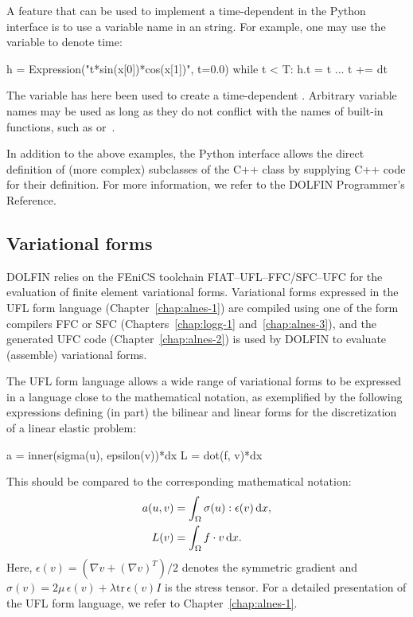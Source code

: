 \enlargethispage{12pt}

A feature that can be used to implement a time-dependent 
in the Python interface is to use a variable name in an 
string.  For example, one may use the variable  to denote time:
\begin{python}
h = Expression("t*sin(x[0])*cos(x[1])", t=0.0)
while t < T:
    h.t = t
    ...
    t += dt
\end{python}
The  variable has here been used to create a time-dependent
. Arbitrary variable names may be used as long as they
do not conflict with the names of built-in functions, such as 
or~.

In addition to the above examples, the Python interface allows
the direct definition of (more complex) subclasses of the C++
 class by supplying C++ code for their definition. For
more information, we refer to the DOLFIN Programmer's Reference.

\subsection{Variational forms}

DOLFIN relies on the FEniCS toolchain FIAT--UFL--FFC/SFC--UFC for the
evaluation of finite element variational forms. Variational forms
expressed in the UFL form language (Chapter~\ref{chap:alnes-1})
are compiled using one of the form compilers FFC or SFC
(Chapters~\ref{chap:logg-1} and~\ref{chap:alnes-3}), and the generated
UFC code (Chapter~\ref{chap:alnes-2}) is used by DOLFIN to
evaluate (assemble) variational forms.

The UFL form language allows a wide range of variational forms to be
expressed in a language close to the mathematical notation, as exemplified
by the following expressions defining (in part) the bilinear and linear
forms for the discretization of a linear elastic problem:
\begin{uflcode}
a = inner(sigma(u), epsilon(v))*dx
L = dot(f, v)*dx
\end{uflcode}
This should be compared to the corresponding mathematical notation:
\begin{align} \label{eq:logg-2:elasticity1}
  a(u, v) &= \int_{\Omega} \sigma(u) : \epsilon(v) \, \mathrm{d}x,
\\
  L(v)    &= \int_{\Omega} f \cdot v \, \mathrm{d}x.
\end{align}
Here, $\epsilon(v) = (\nabla v + (\nabla v)^{T}) / 2$ denotes the
symmetric gradient and $\sigma(v) = 2 \mu \, \epsilon(v) + \lambda
\mathrm{tr} \, \epsilon(v) I$ is the stress tensor. For a detailed
presentation of the UFL form language, we refer to
Chapter~\ref{chap:alnes-1}.

